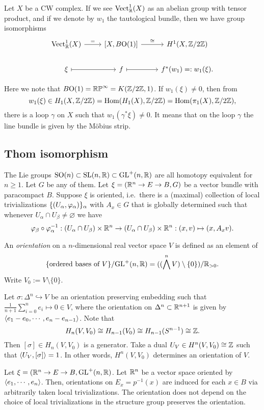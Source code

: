 \documentclass{../../../small}
\begin{document}
\begin{thm*}[4.5]
Let $X$ be a CW complex.
If we see $\mathrm{Vect}_{\mathbb{R}}^1(X)$ as an abelian group with tensor product, and if we denote by $w_1$ the tautological bundle, then we have group isomorphisms
\[\begin{tikzcd}
\mathrm{Vect}_\R^1(X) \ar{r}{=} & {[X,B\rO(1)]} \ar{r}{\cong} & H^1(X,\Z/2\Z) \\
\xi \ar[|->]{r} & f \ar[|->]{r} & f^*(w_1)=:w_1(\xi).
\end{tikzcd}\]
\end{thm*}
Here we note that $B\mathrm{O}(1)=\mathbb{RP}^\infty=K(\mathbb{Z}/2\mathbb{Z},1)$.
If $w_1(\xi)\ne0$, then from
\[w_1(\xi)\in H_1(X,\mathbb{Z}/2\mathbb{Z})=\operatorname{Hom}(H_1(X),\mathbb{Z}/2\mathbb{Z})=\operatorname{Hom}(\pi_1(X),\mathbb{Z}/2\mathbb{Z}),\]
there is a loop $\gamma$ on $X$ such that $w_1(\gamma^*\xi)\ne0$.
It means that on the loop $\gamma$ the line bundle is given by the M\"obius strip.


\subsection*{Thom isomorphism}

The Lie groups $\mathrm{SO}(n)\subset\mathrm{SL}(n,\mathbb{R})\subset\mathrm{GL}^+(n,\mathbb{R})$ are all homotopy equivalent for $n\ge1$.
Let $G$ be any of them.
Let $\xi=(\mathbb{R}^n\to E\to B,G)$ be a vector bundle with paracompact $B$.
Suppose $\xi$ is oriented, i.e.~there is a (maximal) collection of local trivializations $\{(U_\alpha,\varphi_\alpha)\}_\alpha$ with $A_x\in G$ that is globally determined such that whenever $U_\alpha\cap U_\beta\ne\varnothing$ we have
\[\varphi_\beta\circ\varphi_\alpha^{-1}:(U_\alpha\cap U_\beta)\times\mathbb{R}^n\to(U_\alpha\cap U_\beta)\times\mathbb{R}^n:(x,v)\mapsto(x,A_xv).\]

An \emph{orientation} on a $n$-dimensional real vector space $V$ is defined as an element of
\[\{\text{ordered bases of $V$}\}/\mathrm{GL}^+(n,\mathbb{R})=((\bigwedge^n V)\setminus\{0\})/\mathbb{R}_{>0}.\]
Write $V_0:=V\setminus\{0\}$.

Let $\sigma:\Delta^n\hookrightarrow V$ be an orientation preserving embedding such that $\frac1{n+1}\sum_{i=0}^ne_i\mapsto0\in V$, where the orientation on $\Delta^n\subset\mathbb{R}^{n+1}$ is given by $\langle e_1-e_0,\cdots,e_n-e_{n-1}\rangle$. 
Note that
\[H_n(V,V_0)\cong H_{n-1}(V_0)\cong H_{n-1}(S^{n-1})\cong\mathbb{Z}.\]
Then $[\sigma]\in H_n(V,V_0)$ is a generator.
Take a dual $U_V\in H^n(V,V_0)\cong\mathbb{Z}$ such that $\langle U_V,[\sigma]\rangle=1$.
In other words, $H^n(V,V_0)$ determines an orientation of $V$.

Let $\xi=(\mathbb{R}^n\to E\to B,\mathrm{GL}^+(n,\mathbb{R})$.
Let $\mathbb{R}^n$ be a vector space oriented by $\langle e_1,\cdots,e_n\rangle$.
Then, orientations on $E_x=p^{-1}(x)$ are induced for each $x\in B$ via arbitrarily taken local trivializations.
The orientation does not depend on the choice of local trivializations in the structure group preserves the orientation.
\end{document}
